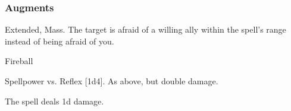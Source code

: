\subsubsection{Augments}
 Extended, Mass.
The target is afraid of a willing ally within the spell's range instead of being afraid of you.
\begin{spellsection}{Fireball}
\begin{spellheader}
\end{spellheader}
\begin{spellcontent}
\begin{spelltargetinginfo}
\end{spelltargetinginfo}
\begin{spelleffects}
\begin{spellattack}{Spellpower vs. Reflex}
\spellsuccess {}[1d4].
\spellcritical As above, but double damage.
\end{spellattack}
\end{spelleffects}
\end{spellcontent}
\begin{spellfooter}
\miscastexplode
\end{spellfooter}
\begin{spellcantrip}
The spell deals \minus1d damage.
\end{spellcantrip}
\end{spellsection}
